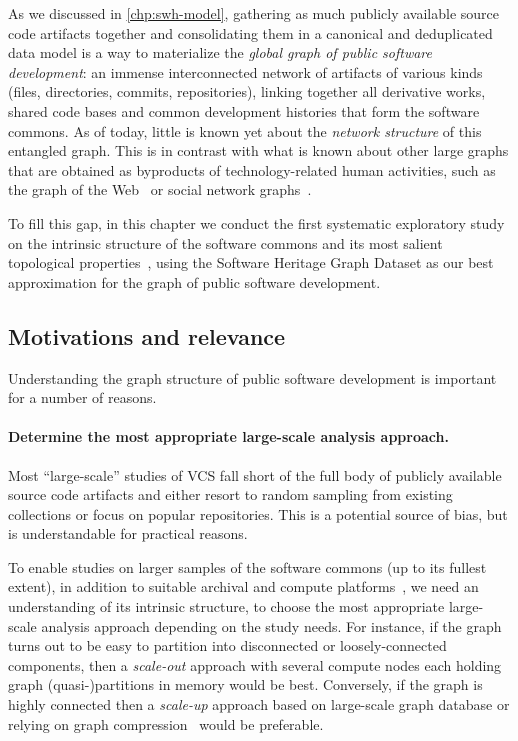 As we discussed in \cref{chp:swh-model}, gathering as much publicly available
source code artifacts together and consolidating them in a canonical and
deduplicated data model is a way to materialize the \emph{global graph of
public software development}: an immense interconnected network of artifacts of
various kinds (files, directories, commits, repositories), linking together all
derivative works, shared code bases and common development histories that
form the software commons. As of today, little is known yet about the
\emph{network structure} of this entangled graph. This is in contrast with what
is known about other large graphs that are obtained as byproducts of
technology-related human activities, such as the graph of the
Web~\cite{vigna2015webstruct} or social network
graphs~\cite{ugander2011facebook, myers2014twitter}.

To fill this gap, in this chapter we conduct the first systematic exploratory
study on the intrinsic structure of the software commons and its most salient
topological properties~\cite{barabasi2002networkstats}, using the Software
Heritage Graph Dataset as our best approximation for the graph of public
software development.

\subsection{Motivations and relevance}

Understanding the graph structure of public software development is important
for a number of reasons.

\paragraph{Determine the most appropriate large-scale analysis approach.}

Most ``large-scale'' studies of VCS fall short of the full body of publicly
available source code artifacts and either resort to random sampling from
existing collections or focus on popular repositories. This is a potential
source of bias, but is understandable for practical reasons.

To enable studies on larger samples of the software commons (up to its fullest
extent), in addition to suitable archival and compute
platforms~\cite{dyer2013boa, swhcacm2018, mockus2019woc}, we need an
understanding of its intrinsic
structure, to choose the most appropriate large-scale analysis approach
depending on the study needs.  For instance, if the graph turns out to be easy
to partition into disconnected or loosely-connected components, then a
\emph{scale-out} approach with several compute nodes each holding graph
(quasi-)partitions in memory would be best. Conversely, if the graph is
highly connected then a \emph{scale-up} approach based on large-scale graph
database or relying on graph compression~\cite{saner-2020-swh-graph} would be
preferable.


